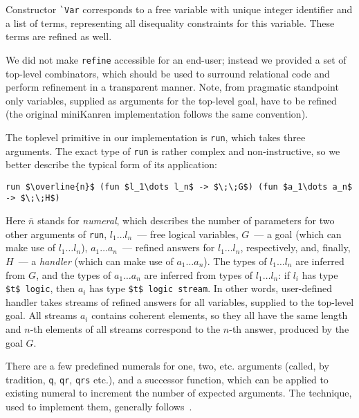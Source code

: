 Constructor \lstinline{`Var} corresponds to a free variable with unique
integer identifier and a list of terms, representing all disequality constraints
for this variable. These terms are refined as well.

We did not make \lstinline{refine} accessible for an end-user; instead we provided
a set of top-level combinators, which should be used to surround relational code
and perform refinement in a transparent manner. Note, from pragmatic
standpoint only variables, supplied as arguments for the top-level goal, have
to be refined (the original miniKanren implementation follows the same convention).

The toplevel primitive in our implementation is \lstinline{run}, which takes three
arguments. The exact type of \lstinline{run} is rather complex and non-instructive, 
so we better describe the typical form of its application:

\begin{lstlisting}[mathescape=true]
   run $\overline{n}$ (fun $l_1\dots l_n$ -> $\;\;G$) (fun $a_1\dots a_n$ -> $\;\;H$)
\end{lstlisting}

Here $\overline{n}$ stands for \emph{numeral}, which describes the number of
parameters for two other arguments of \lstinline{run}, \mbox{$l_1\dots l_n$}~---
free logical variables, $G$~--- a goal (which can make use of \mbox{$l_1\dots l_n$}), 
\mbox{$a_1\dots a_n$}~--- refined answers for \mbox{$l_1\dots l_n$}, respectively, and, 
finally, $H$~--- a \emph{handler} (which can make use of \mbox{$a_1\dots a_n$}). The types of 
\mbox{$l_1\dots l_n$} are inferred from $G$, and the types of \mbox{$a_1\dots a_n$} are
inferred from types of \mbox{$l_1\dots l_n$}: if $l_i$ has type \lstinline[mathescape=true]{$t$ logic}, then
$a_i$ has type \lstinline[mathescape=true]{$t$ logic stream}. In other words, user-defined handler
takes streams of refined answers for all variables, supplied to the top-level goal. All streams $a_i$ contains
coherent elements, so they all have the same length and $n$-th elements of all streams correspond 
to the $n$-th answer, produced by the goal $G$.

There are a few predefined numerals for one, two, etc. arguments (called, by tradition, 
\lstinline{q}, \lstinline{qr}, \lstinline{qrs} etc.), and a successor function, which 
can be applied to existing numeral to increment the number of expected arguments. The
technique, used to implement them, generally follows~\cite{Unparsing, DoWeNeed}.
